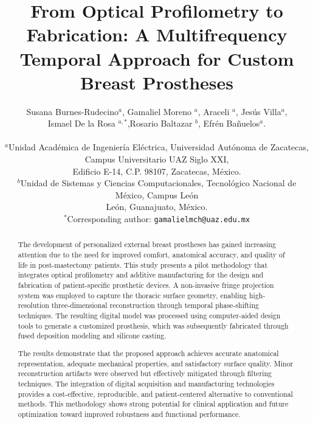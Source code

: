 \documentclass{article}
\begin{document}
	
	\title{From Optical Profilometry to Fabrication: A Multifrequency Temporal Approach for Custom Breast Prostheses}
	\author{
		\normalsize{Susana Burnes-Rudecino$^a$, Gamaliel Moreno $^a$, Araceli $^a$, Jesús Villa$^a$, }\\
        \normalsize{Ismael De la Rosa $^{a,*}$,Rosario Baltazar $^b$,  Efrén Bañuelos$^a$.}\\ \\
		\scriptsize{$^{a}$Unidad Académica de Ingeniería Eléctrica, Universidad Autónoma de Zacatecas, Campus Universitario UAZ Siglo XXI,}\\
		\scriptsize{Edificio E-14, C.P. 98107, Zacatecas, México.}\\
		\scriptsize{$^{b}$Unidad de Sistemas y Ciencias Computacionales, Tecnológico Nacional de México, Campus León}\\
		\scriptsize{León, Guanajuato, México.}\\
		\scriptsize{$^{*}$Corresponding author: \texttt{gamalielmch@uaz.edu.mx}}
	}
	\date{}
	
	\maketitle
	
	\begin{abstract}
        
The development of personalized external breast prostheses has gained increasing attention due to the need for improved comfort, anatomical accuracy, and quality of life in post-mastectomy patients. This study presents a pilot methodology that integrates optical profilometry and additive manufacturing for the design and fabrication of patient-specific prosthetic devices. A non-invasive fringe projection system was employed to capture the thoracic surface geometry, enabling high-resolution three-dimensional reconstruction through temporal phase-shifting techniques. The resulting digital model was processed using computer-aided design tools to generate a customized prosthesis, which was subsequently fabricated through fused deposition modeling and silicone casting. 

The results demonstrate that the proposed approach achieves accurate anatomical representation, adequate mechanical properties, and satisfactory surface quality. Minor reconstruction artifacts were observed but effectively mitigated through filtering techniques. The integration of digital acquisition and manufacturing technologies provides a cost-effective, reproducible, and patient-centered alternative to conventional methods. This methodology shows strong potential for clinical application and future optimization toward improved robustness and functional performance.
\end{abstract}
	
\end{document}
